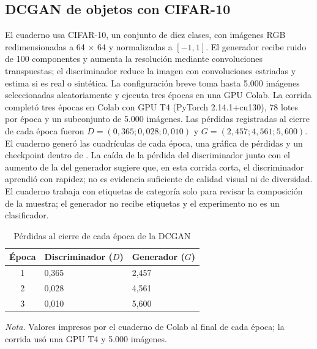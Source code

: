 \documentclass[12pt,letterpaper]{article}
\begin{document}
\subsection{DCGAN de objetos con CIFAR-10}
El cuaderno \texttt{} usa CIFAR-10, un conjunto de diez clases, con imágenes RGB redimensionadas a 64 $\times$ 64 y normalizadas a $[-1,1]$. El generador recibe ruido de 100 componentes y aumenta la resolución mediante convoluciones transpuestas; el discriminador reduce la imagen con convoluciones estriadas y estima si es real o sintética. La configuración breve toma hasta 5.000 imágenes seleccionadas aleatoriamente y ejecuta tres épocas en una GPU Colab. La corrida completó tres épocas en Colab con GPU T4 (PyTorch 2.14.1+cu130), 78 lotes por época y un subconjunto de 5.000 imágenes. Las pérdidas registradas al cierre de cada época fueron $D=(0{,}365; 0{,}028; 0{,}010)$ y $G=(2{,}457; 4{,}561; 5{,}600)$. El cuaderno generó las cuadrículas de cada época, una gráfica de pérdidas y un checkpoint dentro de \texttt{}. La caída de la pérdida del discriminador junto con el aumento de la del generador sugiere que, en esta corrida corta, el discriminador aprendió con rapidez; no es evidencia suficiente de calidad visual ni de diversidad. El cuaderno trabaja con etiquetas de categoría solo para revisar la composición de la muestra; el generador no recibe etiquetas y el experimento no es un clasificador.

\begin{table}[H]
\caption{Pérdidas al cierre de cada época de la DCGAN}
\label{tab:perdidas-dcgan}
\begin{tabularx}{\linewidth}{cXX}
\toprule
Época & Discriminador ($D$) & Generador ($G$) \\
\midrule
1 & 0,365 & 2,457 \\
2 & 0,028 & 4,561 \\
3 & 0,010 & 5,600 \\
\bottomrule
\end{tabularx}
\par\raggedright\vspace{5pt}\noindent\footnotesize\textit{Nota.} Valores impresos por el cuaderno de Colab al final de cada época; la corrida usó una GPU T4 y 5.000 imágenes.\normalsize
\end{table}
\end{document}
